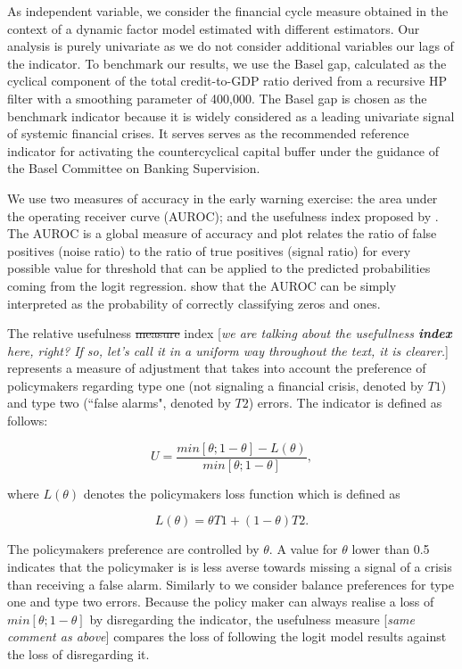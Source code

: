 As independent variable, we consider the financial cycle measure obtained in the context of a dynamic factor model estimated with different estimators. Our analysis is purely univariate as we do not consider additional variables our lags of the indicator. To benchmark our results, we use the Basel gap, calculated as the cyclical component of the total credit-to-GDP ratio derived from a recursive HP filter with a smoothing parameter of 400,000. The Basel gap is chosen as the benchmark indicator because it is widely considered as a leading univariate signal of systemic financial crises. It serves serves as the recommended reference indicator for activating the countercyclical capital buffer under the guidance of the Basel Committee on Banking Supervision.

We use two measures of accuracy in the early warning exercise: the area under the operating receiver curve (AUROC); and the usefulness index proposed by \cite{alessi2011quasi}. The AUROC is a global measure of accuracy and plot relates the ratio of false positives (noise ratio) to the ratio of true positives (signal ratio) for every possible value for threshold that can be applied to the predicted probabilities coming from the logit regression. \citet{hanley1982meaning} show that the AUROC can be simply interpreted as the probability of correctly classifying zeros and ones. 

The relative usefulness {\color{blue}\st{measure} index [\textit{we are talking about the usefullness \textbf{index} here, right? If so, let's call it in a uniform way throughout the text, it is clearer.}]} represents a measure of adjustment that takes into account the preference of policymakers regarding type one (not signaling a financial crisis, denoted by $T1$) and type two (``false alarms", denoted by $T2$) errors. The indicator is defined as follows:

\begin{equation}
    U = \frac{min[\theta; 1- \theta] - L(\theta)}{min[\theta; 1- \theta]},
\end{equation}

where $L(\theta)$ denotes the policymakers loss function which is defined as

\begin{equation}
   L(\theta) = \theta T1 + (1- \theta) T2.
\end{equation} 

The policymakers preference are controlled by $\theta$. A value for $\theta$ lower than 0.5 indicates that the policymaker is is less averse towards missing a signal of a crisis than receiving a false alarm. Similarly to \citet{lang2019anticipating} we consider balance preferences for type one and type two errors. Because the policy maker can always realise a loss of $min[\theta; 1- \theta]$ by disregarding the indicator, the usefulness {\color{blue}measure [\textit{same comment as above}]} compares the loss of following the logit model results against the loss of disregarding it. 

